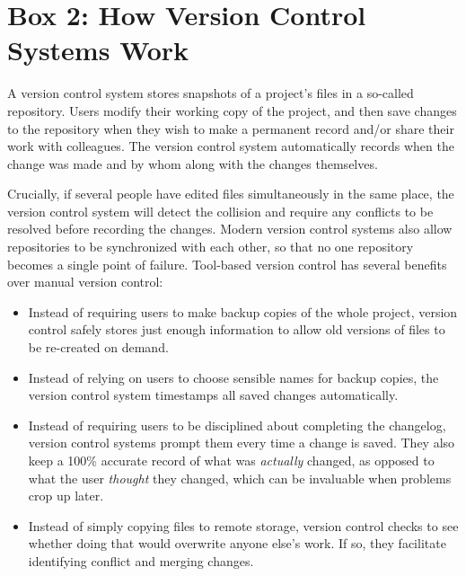 \documentclass[10pt,letterpaper]{article}
\begin{document}
\pagebreak

\section*{Box 2: How Version Control Systems Work}

A version control system stores snapshots of a project's files in a
so-called repository. Users modify their working copy of the project,
and then save changes to the repository when they wish to make
a permanent record and/or share their work with colleagues. The
version control system automatically records when the change was
made and by whom along with the changes themselves.

Crucially, if several people have edited files simultaneously in the same place,
the version control system will detect the collision and require any conflicts
to be resolved before recording the changes. Modern version
control systems also allow repositories to be synchronized with each
other, so that no one repository becomes a single point of failure.
Tool-based version control has several benefits over manual version
control:

\begin{itemize}

\item
  Instead of requiring users to make backup copies of the whole project,
  version control safely stores just enough information to allow old
  versions of files to be re-created on demand.

\item
  Instead of relying on users to choose sensible names for backup
  copies, the version control system timestamps all saved changes
  automatically.

\item
  Instead of requiring users to be disciplined about completing the
  changelog, version control systems prompt them every time a change
  is saved. They also keep a 100\% accurate record of what was
  \emph{actually} changed, as opposed to what the user
  \emph{thought} they changed, which can be invaluable when problems
  crop up later.

\item
  Instead of simply copying files to remote storage, version control
  checks to see whether doing that would overwrite anyone else's
  work. If so, they facilitate identifying conflict and merging changes.

\end{itemize}
\end{document}
